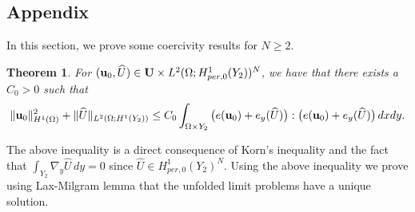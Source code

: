 \documentclass[11pt,a4paper]{article}
\numberwithin{equation}{section}
\def\O{\Omega}
\def\S{{\GS}}
\def\sy{\text{sym}}
\def\R{{\mathbb{R}}}
\def\R{{\mathbb{R}}}
\def\wh{\widehat }
\def\X{\times }
\def\Gu{{\bf u}}
\def\GS{{\bf S}}
\def\GU{{\bf U}}
\newtheorem{theorem}{Theorem}[section]
\newtheorem{lemma}[theorem]{Lemma}
\begin{document}
				\begin{appendices}
					\section{Appendix}
					In this section, we prove some coercivity results for $N\geq 2$.
					\begin{theorem}
						For $(\Gu_0,\wh U)\in \GU\X L^2(\O; H^1_{per,0}(Y_2))^N$, we have that there exists a $C_0>0$ such that
						\begin{equation}\label{Ex01}
							\|\Gu_0\|^2_{H^1(\O)}+\|\wh U\|_{L^2(\O;H^1(Y_2))}\leq C_0\int_{\O\X Y_2}\big(e(\Gu_0)+e_y(\wh U)\big):\big(e(\Gu_0)+e_y(\wh U)\big)\,dxdy.
						\end{equation}
					\end{theorem}
					The above inequality is a direct consequence of Korn's inequality and the fact that $\int_{Y_2}\nabla_y\wh U\,dy=0$ since $\wh U\in H^1_{per,0}(Y_2)^N$. Using the above inequality we prove using Lax-Milgram lemma that the unfolded limit problems have a unique solution.
%					

\end{appendices}
\end{document}
